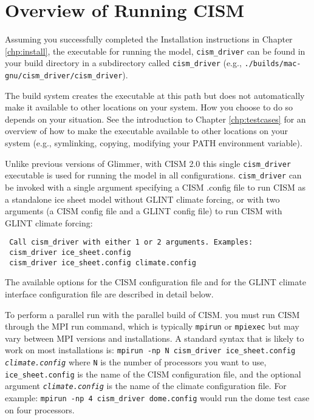 \label{ch:runcism}

\section{Overview of Running CISM}

Assuming you successfully completed the Installation instructions in Chapter \ref{chp:install},
the executable for running the model, \texttt{cism\_driver} can be found in your 
build directory in a subdirectory called \texttt{cism\_driver} 
(e.g., \texttt{./builds/mac-gnu/cism\_driver/cism\_driver}).

The build system creates the executable at this path but does not automatically
make it available to other locations on your system.  How you choose to do so depends 
on your situation.  See the introduction to Chapter \ref{chp:testcases} for 
an overview of how to make the executable available to other locations on your system
(e.g., symlinking, copying, modifying your PATH environment variable).

Unlike previous versions of Glimmer, with CISM 2.0 this single \texttt{cism\_driver} 
executable is used for running the model in all configurations.
\texttt{cism\_driver} can be invoked with a single argument specifying 
a CISM .config file to run CISM as a standalone ice sheet model without GLINT climate forcing,
or with two arguments (a CISM config file and a GLINT config file) 
to run CISM with GLINT climate forcing:
\begin{verbatim}
 Call cism_driver with either 1 or 2 arguments. Examples:
 cism_driver ice_sheet.config
 cism_driver ice_sheet.config climate.config
\end{verbatim}
The available options for the CISM configuration file and 
for the GLINT climate interface configuration file are described in detail below.

To perform a parallel run with the parallel build of CISM. you must run CISM through the 
MPI run command, which is typically \texttt{mpirun} or \texttt{mpiexec} but may 
vary between MPI versions and installations.  A standard syntax that is likely to
work on most installations is: \newline
 \indent \texttt{mpirun -np N cism\_driver ice\_sheet.config \textit{climate.config}} \newline
where \texttt{N} is the number of processors you want to use, \texttt{ice\_sheet.config} is the name of the CISM
configuration file, and the optional argument \texttt{\textit{climate.config}} is the name 
of the climate configuration file.  For example: \newline
 \indent \texttt{mpirun -np 4 cism\_driver dome.config}\newline
would run the dome test case on four processors.

